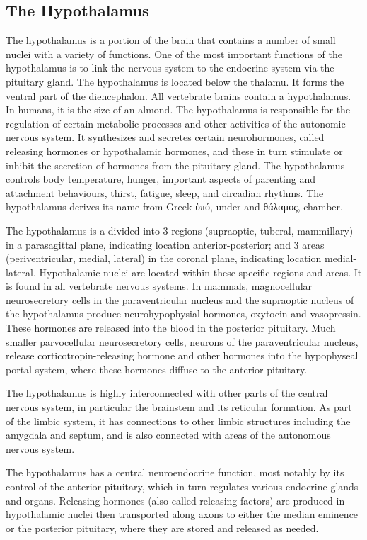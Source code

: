 \hypertarget{the-hypothalamus}{%
\subsection{The Hypothalamus}\label{the-hypothalamus}}

The hypothalamus is a portion of the brain that contains a number of small nuclei with a variety of functions. One of the most important functions of the hypothalamus is to link the nervous system to the endocrine system via the pituitary gland. The hypothalamus is located below the thalamu. It forms the ventral part of the diencephalon. All vertebrate brains contain a hypothalamus. In humans, it is the size of an almond. The hypothalamus is responsible for the regulation of certain metabolic processes and other activities of the autonomic nervous system. It synthesizes and secretes certain neurohormones, called releasing hormones or hypothalamic hormones, and these in turn stimulate or inhibit the secretion of hormones from the pituitary gland. The hypothalamus controls body temperature, hunger, important aspects of parenting and attachment behaviours, thirst, fatigue, sleep, and circadian rhythms. The hypothalamus derives its name from Greek ὑπό, under and θάλαμος, chamber.

The hypothalamus is a divided into 3 regions (supraoptic, tuberal, mammillary) in a parasagittal plane, indicating location anterior-posterior; and 3 areas (periventricular, medial, lateral) in the coronal plane, indicating location medial-lateral. Hypothalamic nuclei are located within these specific regions and areas. It is found in all vertebrate nervous systems. In mammals, magnocellular neurosecretory cells in the paraventricular nucleus and the supraoptic nucleus of the hypothalamus produce neurohypophysial hormones, oxytocin and vasopressin. These hormones are released into the blood in the posterior pituitary. Much smaller parvocellular neurosecretory cells, neurons of the paraventricular nucleus, release corticotropin-releasing hormone and other hormones into the hypophyseal portal system, where these hormones diffuse to the anterior pituitary.

The hypothalamus is highly interconnected with other parts of the central nervous system, in particular the brainstem and its reticular formation. As part of the limbic system, it has connections to other limbic structures including the amygdala and septum, and is also connected with areas of the autonomous nervous system.

The hypothalamus has a central neuroendocrine function, most notably by its control of the anterior pituitary, which in turn regulates various endocrine glands and organs. Releasing hormones (also called releasing factors) are produced in hypothalamic nuclei then transported along axons to either the median eminence or the posterior pituitary, where they are stored and released as needed.


